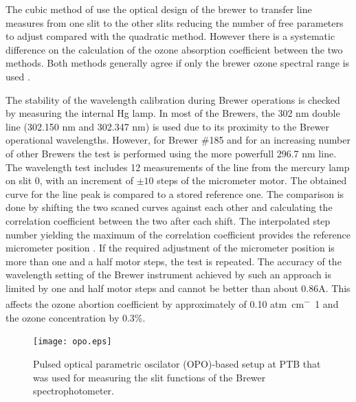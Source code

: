 \documentclass[acp, manuscript]{copernicus}
\begin{document}
The cubic method of \citeauthor{Grobner1998}  use the optical design of the brewer to transfer line measures from one slit to the other slits reducing the number of free parameters to adjust compared with the quadratic method. However  there is a systematic difference on the calculation of the ozone absorption coefficient between the two methods. Both methods generally agree if only the brewer ozone spectral range is used \citep{redondas_regional_2012}.



   The stability of the wavelength calibration during Brewer operations is checked by measuring the internal Hg lamp. In most of the Brewers, the 302 \unit{nm} double line (302.150 nm and 302.347 nm) is used due to its proximity to the Brewer operational wavelengths. However, for Brewer \#185 and for an increasing number of other Brewers the test is  performed using the more powerfull 296.7 \unit{nm} line. The wavelength test includes 12 measurements of the line from the mercury lamp on slit 0, with an increment of  $\pm10$ steps of the micrometer motor. The obtained curve for the line peak is compared to a stored reference one. The comparison is done by shifting the two scaned curves against each other and calculating the correlation coefficient between the two after each shift. The interpolated step number yielding the maximum of the correlation coefficient provides the reference micrometer position \citep{savastiouk2005improvements}. If the required adjustment of the micrometer position is more than one and a half motor steps, the test is repeated. The accuracy of the wavelength setting of the Brewer instrument achieved by such an approach is limited by one and half motor steps and cannot be better than about 0.86A. This affects the ozone abortion coefficient by approximately of 0.10 \unit{atm cm^-1} and the ozone concentration by 0.3\%.
  


\begin{figure}[t]
\texttt{[image: opo.eps]}
\caption{Pulsed optical parametric oscilator (OPO)-based setup at PTB that was used for measuring the slit functions of the Brewer spectrophotometer.}
\label{fig:opo}
\end{figure}
\end{document}
